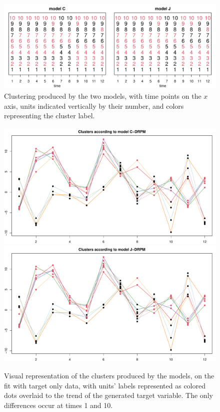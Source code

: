 \documentclass[12pt,	%
	a4paper,		%
	twoside,		%
	openright,		%
	titlepage,%
	]{book}
\theoremstyle{definition}
\begin{document}
\begin{figure}[!htb]
    \centering
    \includegraphics[width=1\linewidth]{Testing/Assessing correctness/no space/partizioni_nums.pdf}
    \caption[Clusters produced by JDRPM and CDRPM fits, target values only]{Clustering produced by the two models, with time points on the $x$ axis, units indicated vertically by their number, and colors representing the cluster label.}
    \label{fig:partizioni no space}
\end{figure}
\begin{figure}[!htb]
    \centering
    \includegraphics[width=1\linewidth]{Testing/Assessing correctness/no space/clusters_C.pdf}
    \includegraphics[width=1\linewidth]{Testing/Assessing correctness/no space/clusters_J.pdf}
    \caption[Visual representation of the clusters of JDRPM and CDRPM fits, target values only]{Visual representation of the clusters produced by the models, on the fit with target only data, with units' labels represented as colored dots overlaid to the trend of the generated target variable. The only differences occur at times 1 and 10.}
    \label{fig:clusters no space}
\end{figure}
\end{document}
